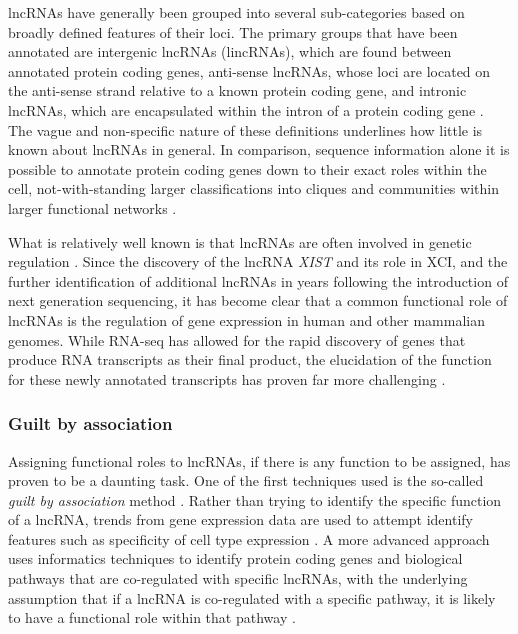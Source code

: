 lncRNAs have generally been grouped into several sub-categories based on broadly defined features of their loci. The primary groups that have been annotated are intergenic lncRNAs (lincRNAs), which are found between annotated protein coding genes, anti-sense lncRNAs, whose loci are located on the anti-sense strand relative to a known protein coding gene, and intronic lncRNAs, which are encapsulated within the intron of a protein coding gene \cite{Rinn2012GenomeRNAs}. The vague and non-specific nature of these definitions underlines how little is known about lncRNAs in general. In comparison, sequence information alone it is possible to annotate protein coding genes down to their exact roles within the cell, not-with-standing larger classifications into cliques and communities within larger functional networks \cite{Loewenstein2009ProteinInference.}. 

What is relatively well known is that lncRNAs are often involved in genetic regulation \cite{Kirk2018FunctionalContent,Schertzer2019LncRNA-InducedDNA,Hacisuleyman2016FunctionLocus,Rinn2012GenomeRNAs}. Since the discovery of the lncRNA \emph{XIST} and its role in XCI, and the further identification of additional lncRNAs in years following the introduction of next generation sequencing, it has become clear that a common functional role of lncRNAs is the regulation of gene expression in human and other mammalian genomes. While RNA-seq has allowed for the rapid discovery of genes that produce RNA transcripts as their final product, the elucidation of the function for these newly annotated transcripts has proven far more challenging \cite{Kirk2018FunctionalContent,Rinn2012GenomeRNAs}. 

\subsubsection{Guilt by association}
Assigning functional roles to lncRNAs, if there is any function to be assigned, has proven to be a daunting task. One of the first techniques used is the so-called \emph{guilt by association} method \cite{Guttman2009ChromatinMammals,Rinn2012GenomeRNAs}. Rather than trying to identify the specific function of a lncRNA, trends from gene expression data are used to attempt identify features such as specificity of cell type expression \cite{Mercer2008SpecificBrain,Perron2017InExpression,Lefever2017DecodeRNA-Guilt-by-association}. A more advanced approach uses informatics techniques to identify protein coding genes and biological pathways that are co-regulated with specific lncRNAs, with the underlying assumption that if a lncRNA is co-regulated with a specific pathway, it is likely to have a functional role within that pathway \cite{Thiel2019IdentifyingAnalysis}. 

